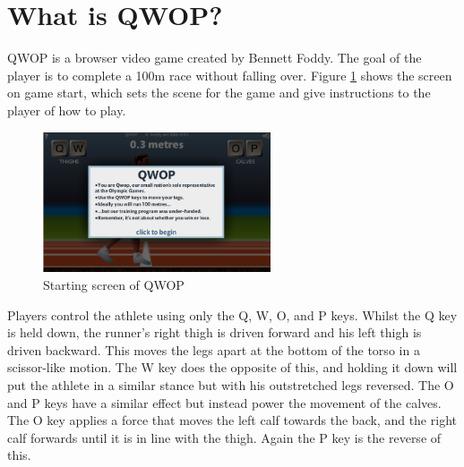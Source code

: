 \documentclass[12pt,a4paper,twoside,openright]{report}
\begin{document}
\section{What is QWOP?}

QWOP is a browser video game created by Bennett Foddy. The goal of the player is to complete a 100m race without falling over.
Figure \ref{startScreen} shows the screen on game start, which sets the scene for the game and give instructions to the player of how to play. 
\begin{figure}[htbp]
	\centering
	\includegraphics[width=0.6\textwidth]{startScreen.PNG}
	\caption{Starting screen of QWOP}
	\label{startScreen}
\end{figure}


Players control the athlete using only the Q, W, O, and P keys. 
Whilst the Q key is held down, the runner's right thigh is driven forward and his left thigh is driven backward. This moves the legs apart at the bottom of the torso in a scissor-like motion. 
The W key does the opposite of this, and holding it down will put the athlete in a similar stance but with his outstretched legs reversed.
The O and P keys have a similar effect but instead power the movement of the calves. The O key applies a force that moves the left calf towards the back, and the right calf forwards until it is in line with the thigh. Again the P key is the reverse of this.
\end{document}
